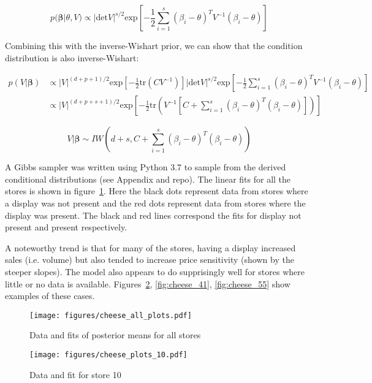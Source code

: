 \documentclass[11pt]{article}
\begin{document}
    $$p(\mathbf{\beta} | \theta, V) \propto | \text{det} V |^{s/2} \text{exp}\left[-\frac{1}{2} \sum_{i=1}^s (\beta_i - \theta)^T V^{-1} (\beta_i - \theta) \right] $$

    \noindent Combining this with the inverse-Wishart prior, we can show that the condition distribution is also inverse-Wishart:

    \begin{align*}
        p(V|\mathbf{\beta}) &\propto |V|^{(d+p+1)/2} \text{exp}\left[-\frac{1}{2} \text{tr}(C V^{-1}) \right] | \text{det} V |^{s/2} \text{exp}\left[-\frac{1}{2} \sum_{i=1}^s (\beta_i - \theta)^T V^{-1} (\beta_i - \theta) \right] \\
        &\propto |V|^{(d+p+s+1)/2} \text{exp}\left[-\frac{1}{2} \text{tr}\left(V^{-1}\left[C + \sum_{i=1}^s(\beta_i - \theta)^T (\beta_i - \theta) \right]\right) \right]
    \end{align*}

    $$V|\mathbf{\beta} \sim IW\left( d+ s, C + \sum_{i=1}^s(\beta_i - \theta)^T (\beta_i - \theta) \right)$$

    A Gibbs sampler was written using Python 3.7 to sample from the derived conditional distributions (see Appendix and repo). The linear fits for all the stores is shown in figure~\ref{fig:all_cheese}. Here the black dots represent data from stores where a display was not present and the red dots represent data from stores where the display was present. The black and red lines correspond the fits for display not present and present respectively. 


    A noteworthy trend is that for many of the stores, having a display increased sales (i.e. volume) but also tended to increase price sensitivity (shown by the steeper slopes). The model also appears to do supprisingly well for stores where little or no data is available. Figures~\ref{fig:cheese_10}, \ref{fig:cheese_41}, \ref{fig:cheese_55} show examples of these cases.

    \begin{figure}[ht] 
      \centering 
      \texttt{[image: figures/cheese\_all\_plots.pdf]}
      \vskip-10pt
      \caption{\label{fig:all_cheese}Data and fits of posterior means for all stores}
    \end{figure}

    \begin{figure}[ht] 
      \centering 
      \texttt{[image: figures/cheese\_plots\_10.pdf]}
      \vskip-10pt
      \caption{\label{fig:cheese_10} Data and fit for store 10}
    \end{figure}
\end{document}
